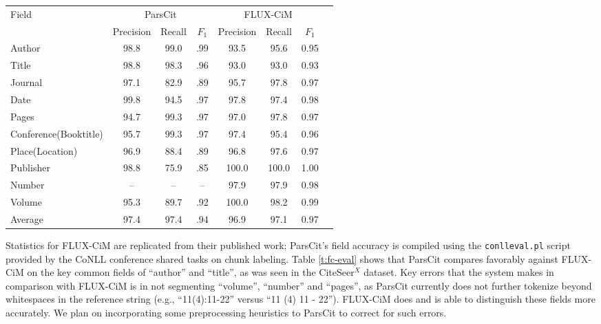 \documentclass[10pt, a4paper]{article}
\begin{document}
\begin{table*}[htb]
\centering
\begin{tabular}{|l|c|c|c|c|c|c|c|}

\hline
Field & \multicolumn{3}{|c|}{ParsCit} & \multicolumn{3}{|c|}{FLUX-CiM} \\
& Precision & Recall & $F_1$ & Precision & Recall & $F_1$ \\ 

\hline
Author	& 98.8 & 99.0 & .99	& 93.5 & 95.6 & 0.95 \\
Title 	& 98.8 & 98.3 & .96	& 93.0 & 93.0 & 0.93 \\
Journal	& 97.1 & 82.9 & .89	& 95.7 & 97.8 & 0.97 \\
Date 	& 99.8 & 94.5 & .97 	& 97.8 & 97.4 & 0.98 \\
Pages 	& 94.7 & 99.3 & .97 	& 97.0 & 97.8 & 0.97 \\
Conference(Booktitle)	& 95.7 & 99.3 & .97 	& 97.4 & 95.4 & 0.96 \\
Place(Location)	& 96.9 & 88.4 & .89	& 96.8 & 97.6 & 0.97 \\
Publisher 	& 98.8 & 75.9 & .85 	& 100.0 & 100.0 & 1.00 \\
Number 	& -- & -- & --	&  97.9 & 97.9 & 0.98 \\
Volume 	& 95.3 & 89.7 & .92	&  100.0 & 98.2 & 0.99 \\
\hline
Average & 97.4 & 97.4 & .94 	& 96.9 & 97.1 & 0.97 \\
\hline
\end{tabular}
\caption{Field reference string parsing performance on the FLUX-CiM dataset.}
\label{t:fc-eval}
\end{table*}

Statistics for FLUX-CiM are replicated from their published work;
ParsCit's field accuracy is compiled using the {\tt conlleval.pl}
script provided by the CoNLL conference shared tasks on chunk
labeling.  Table \ref{t:fc-eval} shows that ParsCit compares favorably
against FLUX-CiM on the key common fields of ``author'' and ``title'', as was
seen in the CiteSeer$^X$ dataset.  Key errors that the system makes in
comparison with FLUX-CiM is in not segmenting ``volume'', ``number'' and
``pages'', as ParsCit currently does not further tokenize beyond
whitespaces in the reference string (e.g., ``11(4):11-22'' versus ``11
(4) 11 - 22'').  FLUX-CiM does and is able to distinguish these fields
more accurately.  We plan on incorporating some preprocessing
heuristics to ParsCit to correct for such errors.
\end{document}
